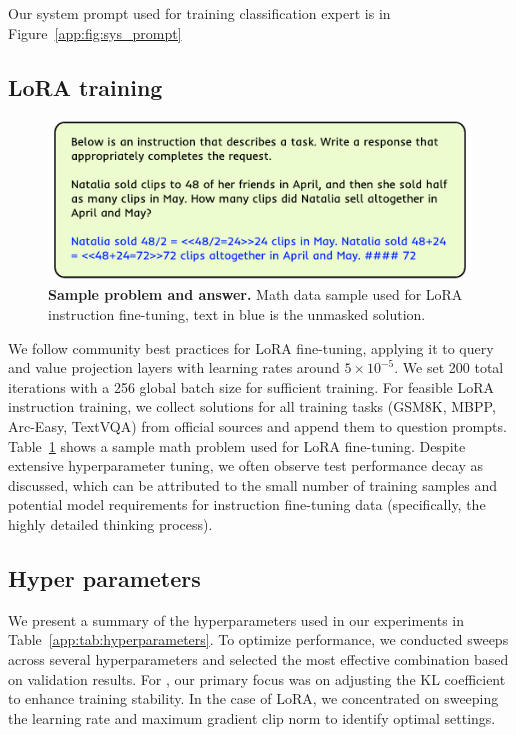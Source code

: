 Our system prompt used for training classification expert is in Figure~\ref{app:fig:sys_prompt}

\subsection{LoRA training}
\begin{figure}
  \centering
  \includegraphics[width=\linewidth]{images/visualization/ift_math_example.pdf}
   \vspace{-6mm}
  \caption{\textbf{Sample problem and answer.} Math data sample used for LoRA instruction fine-tuning, text in blue is the unmasked solution.}
  \label{app:fig:sft_math_example}
\end{figure}

We follow community best practices for LoRA fine-tuning, applying it to query and value projection layers with learning rates around $5 \times 10^{-5}$. 
We set 200 total iterations with a 256 global batch size for sufficient training. For feasible LoRA instruction training, we collect solutions for all training tasks (GSM8K, MBPP, Arc-Easy, TextVQA) from official sources and append them to question prompts. 
Table~\ref{app:fig:sft_math_example} shows a sample math problem used for LoRA fine-tuning.
Despite extensive hyperparameter tuning, we often observe test performance decay as discussed, which can be attributed to the small number of training samples and potential model requirements for instruction fine-tuning data (specifically, the highly detailed thinking process).

\subsection{Hyper parameters}
We present a summary of the hyperparameters used in our experiments in Table~\ref{app:tab:hyperparameters}. To optimize performance, we conducted sweeps across several hyperparameters and selected the most effective combination based on validation results.
For \svdacro, our primary focus was on adjusting the KL coefficient to enhance training stability. In the case of LoRA, we concentrated on sweeping the learning rate and maximum gradient clip norm to identify optimal settings.


